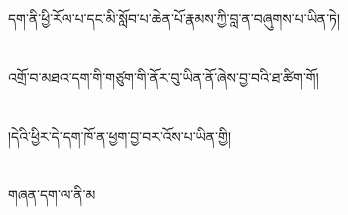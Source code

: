 དག་ནི་ཕྱི་རོལ་པ་དང་མི་སློབ་པ་ཆེན་པོ་རྣམས་ཀྱི་བླ་ན་བཞུགས་པ་ཡིན་ཏེ།\chapter{ }འགྲོ་བ་མཐའ་དག་གི་གཙུག་གི་ནོར་བུ་ཡིན་ནོ་ཞེས་བྱ་བའི་ཐ་ཚིག་གོ།\chapter{ }།དེའི་ཕྱིར་དེ་དག་ཁོ་ན་ཕྱག་བྱ་བར་འོས་པ་ཡིན་གྱི།\chapter{ }གཞན་དག་ལ་ནི་མ